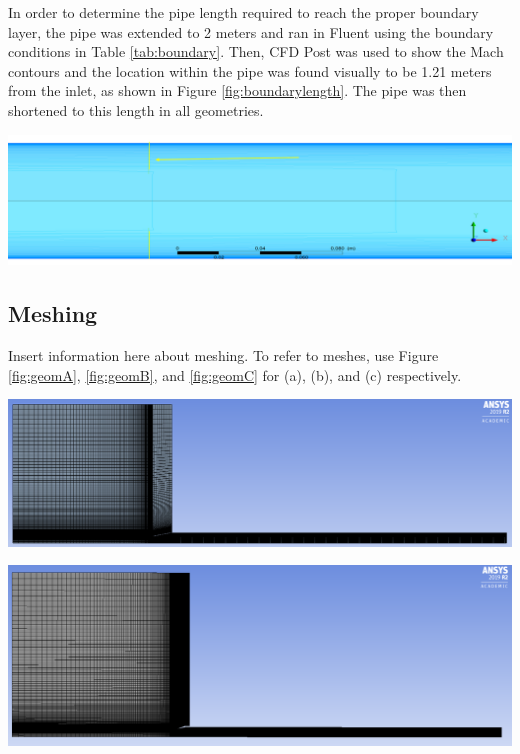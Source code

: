 \documentclass[12pt]{article} %
\begin{document}
In order to determine the pipe length required to reach the proper boundary layer, the pipe was extended to 2 meters and ran in Fluent using the boundary conditions in Table \ref{tab:boundary}. Then, CFD Post was used to show the Mach contours and the location within the pipe was found visually to be 1.21 meters from the inlet, as shown in Figure \ref{fig:boundarylength}. The pipe was then shortened to this length in all geometries.

\begin{center}
    \includegraphics[width = \linewidth]{BoundaryLength.PNG}
    \label{fig:boundarylength}
\end{center}

\subsection{Meshing}\label{section:mesh}
Insert information here about meshing. To refer to meshes, use Figure \ref{fig:geomA}, \ref{fig:geomB}, and \ref{fig:geomC} for (a), (b), and (c) respectively.

\begin{center}
    \includegraphics[width = \linewidth]{NozzleA_Mesh.PNG}
    \label{fig:geomA}
\end{center}

\begin{center}
    \includegraphics[width = \linewidth]{NozzleB_Mesh.PNG}
    \label{fig:geomB}
\end{center}
\end{document}

